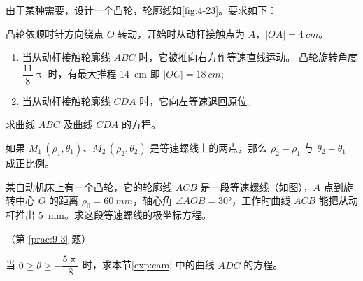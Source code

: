 \begin{example}
  \label{exp:cam}由于某种需要，设计一个凸轮，轮廓线如\cref{fig:4-23}。要求如下：

  凸轮依顺时针方向绕点 $O$ 转动，开始时从动杆接触点为 $A$，$|OA|=\qty{4}{cm}$。
  \begin{enumerate}
    \item 当从动杆接触轮廓线 $ABC$ 时，它被推向右方作等速直线运动。
    凸轮旋转角度 $\dfrac{11}{8}\uppi$ 时，有最大推程 \qty{14}{cm} 即 $|OC|=\qty{18}{cm}$;
    \item 当从动杆接触轮廓线 $CDA$ 时，它向左等速退回原位。
  \end{enumerate}
  求曲线 $ABC$ 及曲线 $CDA$ 的方程。
\end{example}

\begin{solution}
  
\end{solution}

\begin{Practice}
  \begin{question}
    \item 如果 $M_1\,(\rho_1,\theta_1)$、$M_2\,(\rho_2,\theta_2)$ 是等速螺线上的两点，那么 $\rho_2-\rho_1$ 与 $\theta_2-\theta_1$ 成正比例。
    \item\label{prac:9-3} 某自动机床上有一个凸轮，它的轮廓线 $ACB$ 是一段等速螺线（如图），$A$ 点到旋转中心 $O$ 的距离 $\rho_0= \qty{60}{mm}$，轴心角 $\angle AOB= \ang{30}$，工作时曲线 $ACB$ 能把从动杆推出 \qty{5}{mm}。求这段等速螺线的极坐标方程。
    \begin{figurehere}
      \begin{minipage}{\linewidth}\centering
        \caption*{（第 \ref{prac:9-3} 题）}
      \end{minipage}
    \end{figurehere}
    \item 当 $0\geqslant\theta\geqslant-\dfrac{5\uppi}{8}$ 时，求本节\cref{exp:cam} 中的曲线 $ADC$ 的方程。
  \end{question}
\end{Practice}

